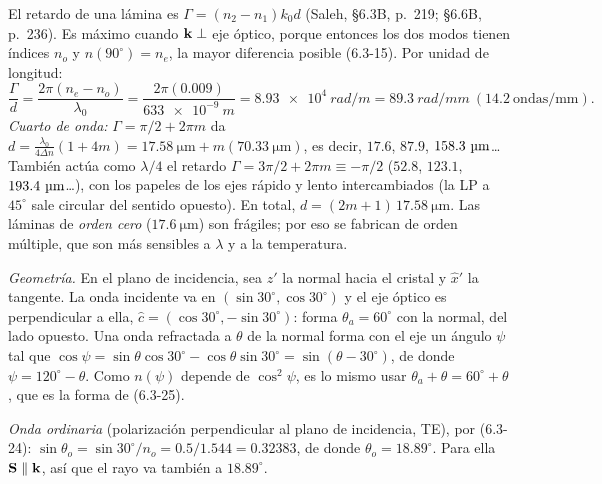 \label{sol:23}

 El retardo de una lámina es $\Gamma=(n_2-n_1)k_0d$ (Saleh, §6.3B, p.~219; §6.6B, p.~236).
Es máximo cuando $\mathbf k\perp$ eje óptico, porque entonces los dos modos tienen índices $n_o$ y
$n(90^\circ)=n_e$, la mayor diferencia posible (6.3-15). Por unidad de longitud:
\[
\frac{\Gamma}{d}=\frac{2\pi(n_e-n_o)}{\lambda_0}=\frac{2\pi(0.009)}{\SI{633e-9}{m}}=\SI{8.93e4}{rad/m}=\SI{89.3}{rad/mm}\ (14.2\ \text{ondas/mm}).
\]
\emph{Cuarto de onda:} $\Gamma=\pi/2+2\pi m$ da
$d=\frac{\lambda_0}{4\Delta n}(1+4m)=\SI{17.58}{\micro\metre}+m(\SI{70.33}{\micro\metre})$, es decir, $17.6$,
$87.9$, $158.3\ \si{\micro\metre}$\ldots{} También actúa como $\lambda/4$ el retardo $\Gamma=3\pi/2+2\pi m\equiv-\pi/2$
($52.8$, $123.1$, $193.4\ \si{\micro\metre}$\ldots), con los papeles de los ejes rápido y lento intercambiados (la LP
a $45^\circ$ sale circular del sentido opuesto). En total, $d=(2m+1)\,\SI{17.58}{\micro\metre}$.
Las láminas de \emph{orden cero} ($\SI{17.6}{\micro\metre}$) son frágiles; por eso se fabrican de orden
múltiple, que son más sensibles a $\lambda$ y a la temperatura.

 \emph{Geometría.} En el plano de incidencia, sea $\hat z'$ la normal hacia el cristal y
$\hat x'$ la tangente. La onda incidente va en $(\sin30^\circ,\cos30^\circ)$ y el eje óptico es
perpendicular a ella, $\hat c=(\cos30^\circ,-\sin30^\circ)$: forma $\theta_a=60^\circ$ con la normal, del
lado opuesto. Una onda refractada a $\theta$ de la normal forma con el eje un ángulo $\psi$ tal que
$\cos\psi=\sin\theta\cos30^\circ-\cos\theta\sin30^\circ=\sin(\theta-30^\circ)$, de donde
$\psi=120^\circ-\theta$. Como $n(\psi)$ depende de $\cos^2\psi$, es lo mismo usar
$\theta_a+\theta=60^\circ+\theta$, que es la forma de (6.3-25).

\emph{Onda ordinaria} (polarización perpendicular al plano de incidencia, TE), por (6.3-24):
$\sin\theta_o=\sin30^\circ/n_o=0.5/1.544=0.32383$, de donde $\theta_o=18.89^\circ$. Para ella $\mathbf S\parallel\mathbf k$,
así que el rayo va también a $18.89^\circ$.

